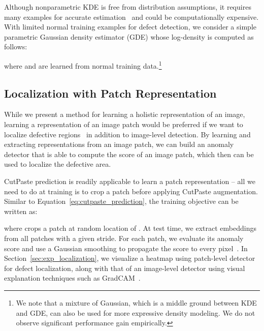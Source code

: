 \documentclass[final]{cvpr}
\begin{document}
Although nonparametric KDE is free from distribution assumptions, it requires many examples for accurate estimation~\cite{tsybakov2008introduction} and could be computationally expensive. With limited normal training examples for defect detection, we consider a simple parametric Gaussian density estimator (GDE) whose log-density is computed as follows:

where  and  are learned from normal training data.\footnote{We note that a mixture of Gaussian, which is a middle ground between KDE and GDE, can also be used for more expressive density modeling. We do not observe significant performance gain empirically.}


\subsection{Localization with Patch Representation}
\label{sec:method_patch}

While we present a method for learning a holistic representation of an image, learning a representation of an image patch would be preferred if we want to localize defective regions~\cite{napoletano2018anomaly,bergmann2020uninformed,yi2020patch} in addition to image-level detection. By learning and extracting representations from an image patch, we can build an anomaly detector that is able to compute the score of an image patch, which then can be used to localize the defective area.

CutPaste prediction is readily applicable to learn a patch representation -- all we need to do at training is to crop a patch before applying CutPaste augmentation. Similar to Equation~\eqref{eq:cutpaste_prediction}, the training objective can be written as:

where  crops a patch at random location of . At test time, 
we extract embeddings from all patches with a given stride.  
For each patch, we evaluate its anomaly score and use a Gaussian smoothing to propagate the score to every pixel~\cite{liznerski2020explainable}. 
In Section~\ref{sec:exp_localization}, we visualize a heatmap using patch-level detector for defect localization, along with that of an image-level detector using visual explanation techniques such as GradCAM~\cite{selvaraju2017grad}.
\end{document}
